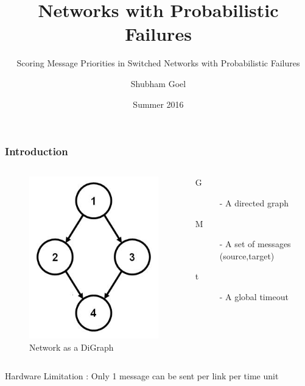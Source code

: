 \documentclass{beamer}
\begin{document}
\title[Probabilistic Networks]{Networks with Probabilistic Failures}
\subtitle[Probabilistically Scoring Message Priorities]{Scoring Message Priorities in Switched Networks with Probabilistic Failures}
\author[Shubham]{Shubham Goel}
\date[Summer 2016]{Summer 2016}

\begin{frame}[plain]
  \titlepage
\end{frame}

\begin{frame}
\frametitle{Introduction}
	\begin{columns}
	\begin{figure}
	\includegraphics[scale=0.3]{media/digraph2.jpg}
	\caption{Network as a DiGraph}
	\end{figure}
	\begin{description}
	\item[G] - A directed graph
	\item[M] - A set of messages (source,target)
	\item[t] - A global timeout
	\end{description}
	\end{columns}
	\vspace*{20pt}
	Hardware Limitation : Only 1 message can be sent per link per time unit
\end{frame}
\end{document}

